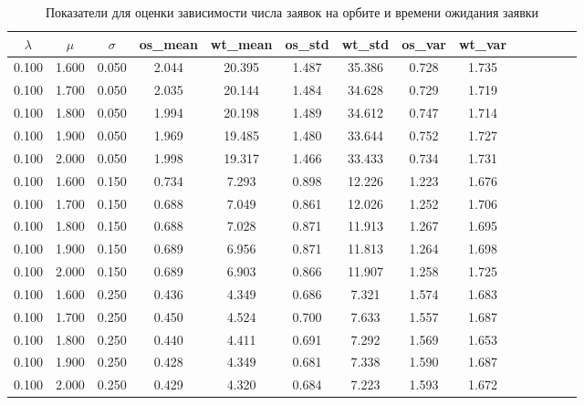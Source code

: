 \begin{table}[H] 
	\centering
	\caption{Показатели для оценки зависимости числа заявок на орбите и времени ожидания заявки}
	\label{sim_result_1}
\begin{tabular}{|c|c|c|c|c|c|c|c|c|c|c|c|c|c|} 
\hline
$\lambda$ & $\mu$   &  $\sigma$ &  os\_mean &   wt\_mean &      os\_std &     wt\_std &       os\_var &     wt\_var \\
\hline
0.100 &           1.600 &           0.050 &    2.044 &   20.395 &   1.487 &  35.386 &   0.728 &   1.735 \\
\hline
0.100 &           1.700 &           0.050 &    2.035 &   20.144 &   1.484 &  34.628 &   0.729 &   1.719 \\
\hline
0.100 &           1.800 &           0.050 &    1.994 &   20.198 &   1.489 &  34.612 &   0.747 &   1.714 \\
\hline
0.100 &           1.900 &           0.050 &    1.969 &   19.485 &   1.480 &  33.644 &   0.752 &   1.727 \\
\hline
0.100 &           2.000 &           0.050 &    1.998 &   19.317 &   1.466 &  33.433 &   0.734 &   1.731 \\
\hline
0.100 &           1.600 &           0.150 &    0.734 &    7.293 &   0.898 &  12.226 &   1.223 &   1.676 \\
\hline
0.100 &           1.700 &           0.150 &    0.688 &    7.049 &   0.861 &  12.026 &   1.252 &   1.706 \\
\hline
0.100 &           1.800 &           0.150 &    0.688 &    7.028 &   0.871 &  11.913 &   1.267 &   1.695 \\
\hline
0.100 &           1.900 &           0.150 &    0.689 &    6.956 &   0.871 &  11.813 &   1.264 &   1.698 \\
\hline
0.100 &           2.000 &           0.150 &    0.689 &    6.903 &   0.866 &  11.907 &   1.258 &   1.725 \\
\hline
0.100 &           1.600 &           0.250 &    0.436 &    4.349 &   0.686 &   7.321 &   1.574 &   1.683 \\
\hline
0.100 &           1.700 &           0.250 &    0.450 &    4.524 &   0.700 &   7.633 &   1.557 &   1.687 \\
\hline
0.100 &           1.800 &           0.250 &    0.440 &    4.411 &   0.691 &   7.292 &   1.569 &   1.653 \\
\hline
0.100 &           1.900 &           0.250 &    0.428 &    4.349 &   0.681 &   7.338 &   1.590 &   1.687 \\
\hline
0.100 &           2.000 &           0.250 &    0.429 &    4.320 &   0.684 &   7.223 &   1.593 &   1.672 \\
\hline
\end{tabular}
\end{table}

